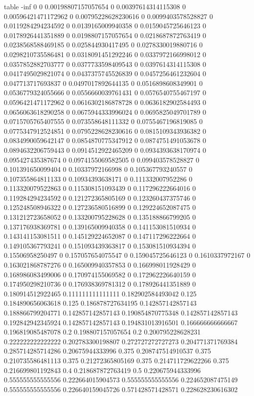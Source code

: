 table {%
-inf 0
0 0.00198807157057654
0 0.00397614314115308
0 0.00596421471172962
0 0.00795228628230616
0 0.0099403578528827
0 0.0119284294234592
0 0.0139165009940358
0 0.0159045725646123
0 0.0178926441351889
0 0.0198807157057654
0 0.0218687872763419
0 0.0238568588469185
0 0.025844930417495
0 0.0278330019880716
0 0.0298210735586481
0 0.0318091451292246
0 0.0337972166998012
0 0.0357852882703777
0 0.0377733598409543
0 0.0397614314115308
0 0.0417495029821074
0 0.0437375745526839
0 0.0457256461232604
0 0.047713717693837
0 0.0497017892644135
0 0.0516898608349901
0 0.0536779324055666
0 0.0556660039761431
0 0.0576540755467197
0 0.0596421471172962
0 0.0616302186878728
0 0.0636182902584493
0 0.0656063618290258
0 0.0675944333996024
0 0.0695825049701789
0 0.0715705765407555
0 0.073558648111332
0 0.0755467196819085
0 0.0775347912524851
0 0.0795228628230616
0 0.0815109343936382
0 0.0834990059642147
0 0.0854870775347912
0 0.0874751491053678
0 0.0894632206759443
0 0.0914512922465209
0 0.0934393638170974
0 0.095427435387674
0 0.0974155069582505
0 0.099403578528827
0 0.101391650099404
0 0.10337972166998
0 0.105367793240557
0 0.107355864811133
0 0.10934393638171
0 0.111332007952286
0 0.113320079522863
0 0.115308151093439
0 0.117296222664016
0 0.119284294234592
0 0.121272365805169
0 0.123260437375746
0 0.125248508946322
0 0.127236580516899
0 0.129224652087475
0 0.131212723658052
0 0.133200795228628
0 0.135188866799205
0 0.137176938369781
0 0.139165009940358
0 0.141153081510934
0 0.143141153081511
0 0.145129224652087
0 0.147117296222664
0 0.149105367793241
0 0.151093439363817
0 0.153081510934394
0 0.15506958250497
0 0.157057654075547
0 0.159045725646123
0 0.1610337972167
0 0.163021868787276
0 0.165009940357853
0 0.166998011928429
0 0.168986083499006
0 0.170974155069582
0 0.172962226640159
0 0.174950298210736
0 0.176938369781312
0 0.178926441351889
0 0.180914512922465
0.111111111111111 0.182902584493042
0.125 0.184890656063618
0.125 0.186878727634195
0.142857142857143 0.188866799204771
0.142857142857143 0.190854870775348
0.142857142857143 0.192842942345924
0.142857142857143 0.194831013916501
0.166666666666667 0.196819085487078
0.2 0.198807157057654
0.2 0.200795228628231
0.222222222222222 0.202783300198807
0.272727272727273 0.204771371769384
0.285714285714286 0.20675944333996
0.375 0.208747514910537
0.375 0.210735586481113
0.375 0.21272365805169
0.375 0.214711729622266
0.375 0.216699801192843
0.4 0.218687872763419
0.5 0.220675944333996
0.555555555555556 0.222664015904573
0.555555555555556 0.224652087475149
0.555555555555556 0.226640159045726
0.571428571428571 0.228628230616302
}

